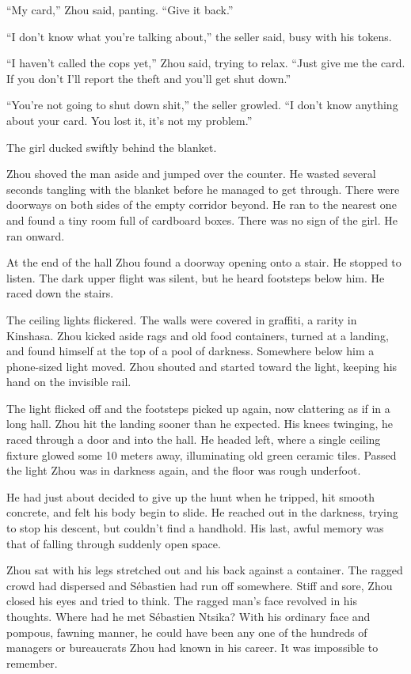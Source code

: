 \documentclass[10pt,b5paper]{article}
\begin{document}
``My card,'' Zhou said, panting. ``Give it back.''

``I don't know what you're talking about,'' the seller said, busy
with his tokens.

``I haven't called the cops yet,'' Zhou said, trying to relax.
``Just give me the card. If you don't I'll report the theft and
you'll get shut down.''

``You're not going to shut down shit,'' the seller growled. ``I don't
know anything about your card. You lost it, it's not my problem.''

The girl ducked swiftly behind the blanket.

Zhou shoved the man aside and jumped over the counter. He wasted
several seconds tangling with the blanket before he managed to get
through. There were doorways on both sides of the empty corridor
beyond. He ran to the nearest one and found a tiny room full of
cardboard boxes. There was no sign of the girl. He ran onward.

At the end of the hall Zhou found a doorway opening onto a stair. He
stopped to listen. The dark upper flight was silent, but he heard
footsteps below him. He raced down the stairs.

The ceiling lights flickered. The walls were covered in graffiti,
a rarity in Kinshasa. Zhou kicked aside rags and old food
containers, turned at a landing, and found himself at the top of
a pool of darkness. Somewhere below him a phone-sized light moved.
Zhou shouted and started toward the light, keeping his hand on the
invisible rail.

The light flicked off and the footsteps picked up again, now
clattering as if in a long hall. Zhou hit the landing sooner than he
expected. His knees twinging, he raced through a door and into the
hall. He headed left, where a single ceiling fixture glowed some
10 meters away, illuminating old green ceramic tiles. Passed the
light Zhou was in darkness again, and the floor was rough underfoot.

He had just about decided to give up the hunt when he tripped,
hit smooth concrete, and felt his body begin to slide. He reached
out in the darkness, trying to stop his descent, but couldn't find
a handhold. His last, awful memory was that of falling through
suddenly open space.

\bigskip

Zhou sat with his legs stretched out and his back against a
container. The ragged crowd had dispersed and S\'{e}bastien had run
off somewhere. Stiff and sore, Zhou closed his eyes and tried to
think. The ragged man's face revolved in his thoughts. Where had he
met S\'{e}bastien Ntsika? With his ordinary face and pompous, fawning
manner, he could have been any one of the hundreds of managers
or bureaucrats Zhou had known in his career. It was impossible
to remember.
\end{document}
